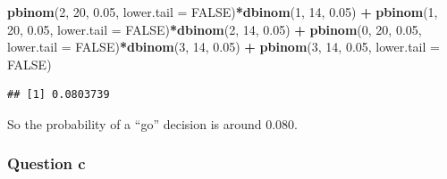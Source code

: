 \documentclass[]{article}
\newenvironment{Shaded}{\begin{snugshade}}{\end{snugshade}}
\newcommand{\DataTypeTok}[1]{\textcolor[rgb]{0.13,0.29,0.53}{#1}}
\newcommand{\DecValTok}[1]{\textcolor[rgb]{0.00,0.00,0.81}{#1}}
\newcommand{\FloatTok}[1]{\textcolor[rgb]{0.00,0.00,0.81}{#1}}
\newcommand{\KeywordTok}[1]{\textcolor[rgb]{0.13,0.29,0.53}{\textbf{#1}}}
\newcommand{\NormalTok}[1]{#1}
\newcommand{\OperatorTok}[1]{\textcolor[rgb]{0.81,0.36,0.00}{\textbf{#1}}}
\newcommand{\OtherTok}[1]{\textcolor[rgb]{0.56,0.35,0.01}{#1}}
\newcommand{\StringTok}[1]{\textcolor[rgb]{0.31,0.60,0.02}{#1}}
\begin{document}
\begin{Shaded}
\begin{Highlighting}[]
\KeywordTok{pbinom}\NormalTok{(}\DecValTok{2}\NormalTok{, }\DecValTok{20}\NormalTok{, }\FloatTok{0.05}\NormalTok{, }\DataTypeTok{lower.tail =} \OtherTok{FALSE}\NormalTok{)}\OperatorTok{*}\KeywordTok{dbinom}\NormalTok{(}\DecValTok{1}\NormalTok{, }\DecValTok{14}\NormalTok{, }\FloatTok{0.05}\NormalTok{) }\OperatorTok{+}\StringTok{ }\KeywordTok{pbinom}\NormalTok{(}\DecValTok{1}\NormalTok{, }\DecValTok{20}\NormalTok{, }\FloatTok{0.05}\NormalTok{, }\DataTypeTok{lower.tail =} \OtherTok{FALSE}\NormalTok{)}\OperatorTok{*}\KeywordTok{dbinom}\NormalTok{(}\DecValTok{2}\NormalTok{, }\DecValTok{14}\NormalTok{, }\FloatTok{0.05}\NormalTok{) }\OperatorTok{+}\StringTok{ }\KeywordTok{pbinom}\NormalTok{(}\DecValTok{0}\NormalTok{, }\DecValTok{20}\NormalTok{, }\FloatTok{0.05}\NormalTok{, }\DataTypeTok{lower.tail =} \OtherTok{FALSE}\NormalTok{)}\OperatorTok{*}\KeywordTok{dbinom}\NormalTok{(}\DecValTok{3}\NormalTok{, }\DecValTok{14}\NormalTok{, }\FloatTok{0.05}\NormalTok{) }\OperatorTok{+}\StringTok{ }\KeywordTok{pbinom}\NormalTok{(}\DecValTok{3}\NormalTok{, }\DecValTok{14}\NormalTok{, }\FloatTok{0.05}\NormalTok{, }\DataTypeTok{lower.tail =} \OtherTok{FALSE}\NormalTok{)}
\end{Highlighting}
\end{Shaded}

\begin{verbatim}
## [1] 0.0803739
\end{verbatim}

So the probability of a ``go'' decision is around 0.080.

\hypertarget{question-c}{%
\subsubsection{Question c}\label{question-c}}
\end{document}
